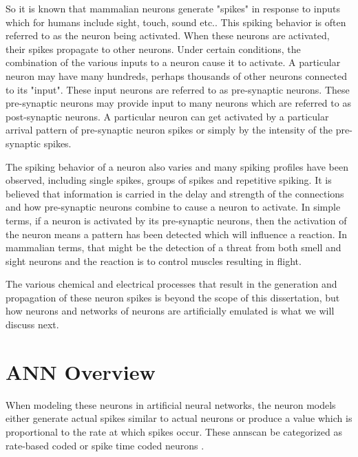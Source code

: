 \iftrue
So it is known that mammalian neurons generate "spikes" in response to inputs which for humans include sight, touch, sound etc.. This spiking behavior is often referred to as the neuron being activated.
When these neurons are activated, their spikes propagate to other neurons. Under certain conditions, the combination of the various inputs to a neuron cause it to activate. 
A particular neuron may have many hundreds, perhaps thousands of other neurons connected to its "input".
These input neurons are referred to as pre-synaptic neurons. These pre-synaptic neurons may provide input to many neurons which are referred to as post-synaptic neurons.
A particular neuron can get activated by a particular arrival pattern of pre-synaptic neuron spikes or simply by the intensity of the pre-synaptic spikes. 

The spiking behavior of a neuron also varies and many spiking profiles have been observed, including single spikes, groups of spikes and repetitive spiking. 
It is believed that information is carried in the delay and strength of the connections and how pre-synaptic neurons combine to cause a neuron to activate.
In simple terms, if a neuron is activated by its pre-synaptic neurons, then the activation of the neuron means a pattern has been detected which will influence a reaction.
In mammalian terms, that might be the detection of a threat from both smell and sight neurons and the reaction is to control muscles resulting in flight.


The various chemical and electrical processes that result in the generation and propagation of these neuron spikes is beyond the scope of this dissertation, but how neurons and networks of neurons are artificially emulated is what we will discuss next.


\section[ANN Overview]{ANN Overview}
\label{sec:ANN Overview}

When modeling these neurons in artificial neural networks, the neuron models either generate actual spikes similar to actual neurons or
produce a value which is proportional to the rate at which spikes occur.
These \acp{ann}can be categorized as rate-based coded or spike time coded neurons \cite{NNintro_Bullinaria}\cite{10.3389/fnsys.2015.00151}.


